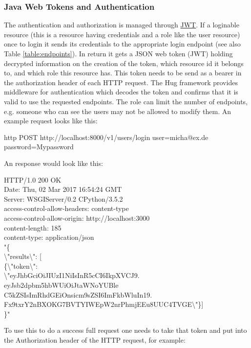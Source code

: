 \subsubsection{Java Web Tokens and Authentication}\label{subsubsection:auth}
The authentication and authorization is managed through \href{https://github.com/jpadilla/pyjwt}{JWT}. If a loginable resource (this is a resource having credentials and a role like the  user resource) once to login it sends its credentials to the appropriate login endpoint (see also Table \ref{table:endpoints}). In return it gets a JSON web token (JWT) holding decrypted information on the creation of the token, which resource id it belongs to, and which role this resource has. This token needs to be send as a bearer in the authorization header of each HTTP request. The Hug framework provides middleware for authentication which decodes the token and confirms that it is valid to use the requested endpoints. The role can limit the number of endpoints, e.g. someone who can see the users may not be allowed to modify them. An example request looks like this:
\begin{tcolorbox}
	http POST http://localhost:8000/v1/users/login user=micha@ex.de password=Mypassword
\end{tcolorbox}
An response would look like this:
\begin{tcolorbox}
HTTP/1.0 200 OK\\
Date: Thu, 02 Mar 2017 16:54:24 GMT\\
Server: WSGIServer/0.2 CPython/3.5.2\\
access-control-allow-headers: content-type\\
access-control-allow-origin: http://localhost:3000\\
content-length: 185\\
content-type: application/json\\

"\{\\
\textbackslash"results\textbackslash": [\\
\{\textbackslash"token\textbackslash": \\
\textbackslash"eyJhbGciOiJIUzI1NiIsInR5cCI6IkpXVCJ9.\\
eyJsb2dpbm5hbWUiOiJtaWNoYUBle\\
C5kZSIsImRhdGEiOnsicm9sZSI6ImFkbWluIn19.\\
Fx9txrY2nBXOKG7BVTYIWEpW2nrPhmjEEu8UUC4TVGE\textbackslash"\}]\\
\}"
\end{tcolorbox}
To use this to do a success full request one needs to take that token and put into the Authorization header of the HTTP request, for example:
